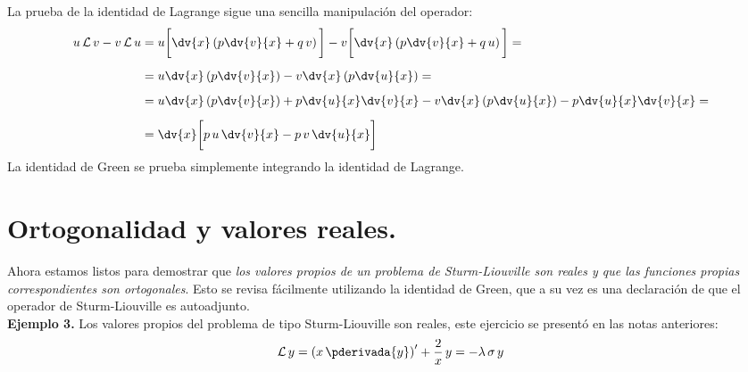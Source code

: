 La prueba de la identidad de Lagrange sigue una sencilla manipulación del operador:
\begin{align}
\begin{aligned}[b]
u \, \mathcal{L} \, v - v \, \mathcal{L} \, u &= u \bigg[ \dv{x} \left( p \dv{v}{x} + q \, v \right) \bigg] - v \bigg[ \dv{x} \left( p \dv{v}{x} + q \, u \right) \bigg] = \\[0.5em]
&= u \dv{x} \left( p \dv{v}{x} \right) - v \dv{x} \left( p \dv{u}{x} \right) = \\[0.5em]
&= u \dv{x} \left( p \dv{v}{x} \right) + p \dv{u}{x} \dv{v}{x} - v \dv{x} \left( p \dv{u}{x} \right) - p \dv{u}{x} \dv{v}{x} = \\[0.5em]
&= \dv{x} \bigg[ p \, u \, \dv{v}{x} - p \, v \, \dv{u}{x}  \bigg]
\end{aligned}
\label{eq:ecuacion_04_21}
\end{align}
La identidad de Green se prueba simplemente integrando la identidad de Lagrange.

\newpage

\section{Ortogonalidad y valores reales.}

Ahora estamos listos para demostrar que \emph{los valores propios de un problema de Sturm-Liouville son reales y que las funciones propias correspondientes son ortogonales}. Esto se revisa fácilmente utilizando la identidad de Green, que a su vez es una declaración de que el operador de Sturm-Liouville es autoadjunto.
\\
\noindent
\textbf{Ejemplo 3.} Los valores propios del problema de tipo Sturm-Liouville son reales, este ejercicio se presentó en las  notas anteriores:
\begin{align*}
\mathcal{L} \, y = \left( x \, \pderivada{y} \right)^{\prime} + \dfrac{2}{x} \, y = - \lambda \, \sigma \, y
\end{align*}

